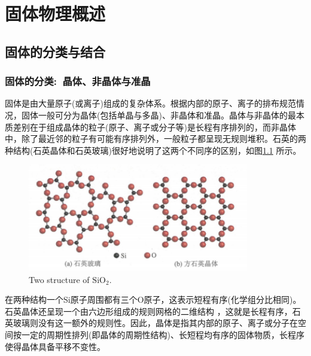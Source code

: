 \setcounter{chapter}{7}
\chapter{固体物理概述}\label{chap:Solid-state_introduct}
\section{固体的分类与结合}

\subsection{固体的分类:~晶体、非晶体与准晶}
固体是由大量原子(或离子)组成的复杂体系。根据内部的原子、离子的排布规范情况，固体一般可分为晶体(包括单晶与多晶)、非晶体和准晶。晶体与非晶体的最本质差别在于组成晶体的粒子(原子、离子或分子等)是长程有序排列的，而非晶体中，除了最近邻的粒子有可能有序排列外，一般粒子都呈现无规则堆积。石英的两种结构(石英晶体和石英玻璃)很好地说明了这两个不同序的区别，如图\ref{Fig:SSI-01} 所示。
\begin{figure}[h!]
\centering
\vspace*{-0.18in}
\includegraphics[height=1.85in,width=3.8in,viewport=0 0 84 40,clip]{Figures/2D-SiO2.png}
\caption{\small \textrm{Two structure of $\mathrm{SiO}_2$.}}%
\label{Fig:SSI-01}
\end{figure}
在两种结构一个Si原子周围都有三个O原子，这表示短程有序(化学组分比相同)。石英晶体还呈现一个由六边形组成的规则网格的二维结构 ，这就是长程有序，石英玻璃则没有这一额外的规则性。因此，{\heiti 晶体是指其内部的原子、离子或分子在空间按一定的周期性排列(即晶体的周期性结构)、长短程均有序的固体物质，长程序使得晶体具备平移不变性。}

